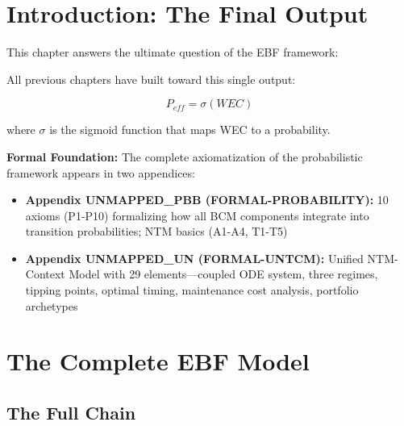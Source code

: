 \section{Introduction: The Final Output}\label{sec:ch16-intro}

This chapter answers the ultimate question of the EBF framework:

\begin{center}
\end{center}

All previous chapters have built toward this single output:

\begin{equation}
\boxed{P_{eff} = \sigma(WEC)}
\end{equation}

where $\sigma$ is the sigmoid function that maps WEC to a probability.

\textbf{Formal Foundation:} The complete axiomatization of the probabilistic framework appears in two appendices:
\begin{itemize}[nosep]
\item \textbf{Appendix UNMAPPED_PBB (FORMAL-PROBABILITY):} 10 axioms (P1-P10) formalizing how all BCM components integrate into transition probabilities; NTM basics (A1-A4, T1-T5)
\item \textbf{Appendix UNMAPPED_UN (FORMAL-UNTCM):} Unified NTM-Context Model with 29 elements---coupled ODE system, three regimes, tipping points, optimal timing, maintenance cost analysis, portfolio archetypes
\end{itemize}

\section{The Complete EBF Model}\label{sec:ch16-model}

\subsection{The Full Chain}

